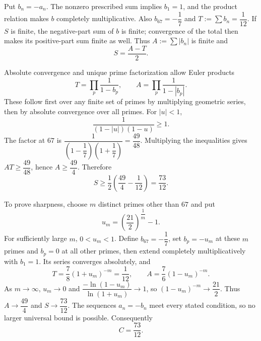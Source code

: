 Put $b_n=-a_n$. The nonzero prescribed sum implies $b_1=1$, and the product relation makes $b$ completely multiplicative. Also $b_{67}=-\dfrac{1}{7}$ and $T:=\sum b_n=\dfrac{1}{12}$. If $S$ is finite, the negative-part sum of $b$ is finite; convergence of the total then makes its positive-part sum finite as well. Thus $A:=\sum|b_n|$ is finite and
\[
S=\dfrac{A-T}{2}.
\]

Absolute convergence and unique prime factorization allow Euler products
\[
T=\prod_p\dfrac{1}{1-b_p},\qquad
A=\prod_p\dfrac{1}{1-|b_p|}.
\]
These follow first over any finite set of primes by multiplying geometric series, then by absolute convergence over all primes. For $|u|<1$,
\[
\dfrac{1}{(1-|u|)(1-u)}\ge1.
\]
The factor at $67$ is $\dfrac{1}{(1-\dfrac{1}{7})(1+\dfrac{1}{7})}=\dfrac{49}{48}$. Multiplying the inequalities gives $AT\ge\dfrac{49}{48}$, hence $A\ge\dfrac{49}{4}$. Therefore
\[
S\ge\dfrac{1}{2}\left(\dfrac{49}{4}-\dfrac{1}{12}\right)=\dfrac{73}{12}.
\]

To prove sharpness, choose $m$ distinct primes other than $67$ and put
\[
u_m=\left(\dfrac{21}{2}\right)^{\dfrac{1}{m}}-1.
\]
For sufficiently large $m$, $0<u_m<1$. Define $b_{67}=-\dfrac{1}{7}$, set $b_p=-u_m$ at these $m$ primes and $b_p=0$ at all other primes, then extend completely multiplicatively with $b_1=1$. Its series converges absolutely, and
\[
T=\dfrac{7}{8}(1+u_m)^{-m}=\dfrac{1}{12},\qquad
A=\dfrac{7}{6}(1-u_m)^{-m}.
\]
As $m\to\infty$, $u_m\to0$ and
$\dfrac{-\ln(1-u_m)}{\ln(1+u_m)}\to1$, so $(1-u_m)^{-m}\to\dfrac{21}{2}$. Thus $A\to\dfrac{49}{4}$ and $S\to\dfrac{73}{12}$. The sequences $a_n=-b_n$ meet every stated condition, so no larger universal bound is possible. Consequently
\[
\boxed{C=\dfrac{73}{12}}.
\]
